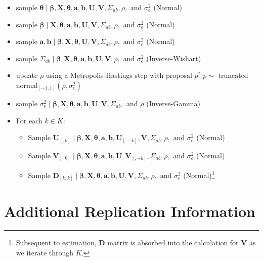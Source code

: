 \documentclass[12pt]{amsart}
\begin{document}
 \begin{itemize}
  \item sample $\bm\theta \; | \;  \bm\beta, \mathbf{X}, \bm\theta, \mathbf{a}, \mathbf{b}, \mathbf{U}, \mathbf{V}, \Sigma_{ab}, \rho, \text{ and } \sigma_{\epsilon}^{2}$ (Normal)
  \item sample $\bm\beta \; | \;  \mathbf{X}, \bm\theta, \mathbf{a}, \mathbf{b}, \mathbf{U}, \mathbf{V}, \Sigma_{ab}, \rho, \text{ and } \sigma_{\epsilon}^{2}$ (Normal)
  \item sample $\mathbf{a}, \mathbf{b} \; | \; \bm\beta, \mathbf{X}, \bm\theta, \mathbf{U}, \mathbf{V}, \Sigma_{ab}, \rho, \text{ and } \sigma_{\epsilon}^{2}$ (Normal)
  \item sample $\Sigma_{ab} \; | \; \bm\beta, \mathbf{X}, \bm\theta, \mathbf{a}, \mathbf{b}, \mathbf{U}, \mathbf{V}, \rho, \text{ and } \sigma_{\epsilon}^{2}$ (Inverse-Wishart)
  \item update $\rho$ using a Metropolis-Hastings step with proposal $p^{*} | p  \sim$ truncated normal$_{[-1,1]}(\rho, \sigma_{\epsilon}^{2})$
  \item sample $\sigma_{\epsilon}^{2} \; | \; \bm\beta, \mathbf{X}, \bm\theta, \mathbf{a}, \mathbf{b}, \mathbf{U}, \mathbf{V}, \Sigma_{ab}, \text{ and } \rho$ (Inverse-Gamma)
  \item For each $k \in K$:
  \begin{itemize}
    \item Sample $\mathbf{U}_{[,k]} \; | \; \bm\beta, \mathbf{X}, \bm\theta, \mathbf{a}, \mathbf{b}, \mathbf{U}_{[,-k]}, \mathbf{V}, \Sigma_{ab}, \rho, \text{ and } \sigma_{\epsilon}^{2}$ (Normal)
    \item Sample $\mathbf{V}_{[,k]} \; | \; \bm\beta, \mathbf{X}, \bm\theta, \mathbf{a}, \mathbf{b}, \mathbf{U}, \mathbf{V}_{[,-k]}, \Sigma_{ab}, \rho, \text{ and } \sigma_{\epsilon}^{2}$ (Normal)
    \item Sample $\mathbf{D}_{[k,k]}  \; | \; \bm\beta, \mathbf{X}, \bm\theta,\mathbf{a}, \mathbf{b}, \mathbf{U}, \mathbf{V}, \Sigma_{ab}, \rho, \text{ and } \sigma_{\epsilon}^{2}$ (Normal)\footnote{Subsequent to estimation, $\mathbf{D}$ matrix is absorbed into the calculation for $\mathbf{V}$ as we iterate through $K$. }
  \end{itemize}
 \end{itemize}
\newpage

\section{Additional Replication Information}
\end{document}
